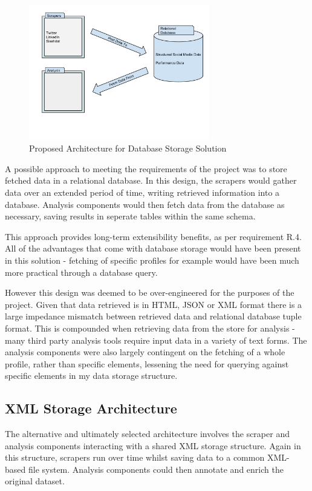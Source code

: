 \begin{figure}[h!]
 \centering
 \includegraphics[width=0.7\textwidth]{Images/Database_Architecture.pdf}
 \caption{Proposed Architecture for Database Storage Solution}
\end{figure}

A possible approach to meeting the requirements of the project was to store fetched data in a relational database. In this design, the scrapers would gather data over an extended period of time, writing retrieved information into a database. Analysis components would then fetch data from the database as necessary, saving results in seperate tables within the same schema.

This approach provides long-term extensibility benefits, as per requirement R.4. All of the advantages that come with database storage would have been present in this solution - fetching of specific profiles for example would have been much more practical through a database query. 

However this design was deemed to be over-engineered for the purposes of the project. Given that data retrieved is in HTML, JSON or XML format there is a large impedance mismatch between retrieved data and relational database tuple format. This is compounded when retrieving data from the store for analysis - many third party analysis tools require input data in a variety of text forms.  The analysis components were also largely contingent on the fetching of a whole profile, rather than specific elements, lessening the need for querying against specific elements in my data storage structure. 

\subsection{XML Storage Architecture}

The alternative and ultimately selected architecture involves the scraper and analysis components interacting with a shared XML storage structure. Again in this structure, scrapers run over time whilst saving data to a common XML-based file system. Analysis components could then annotate and enrich the original dataset. 

